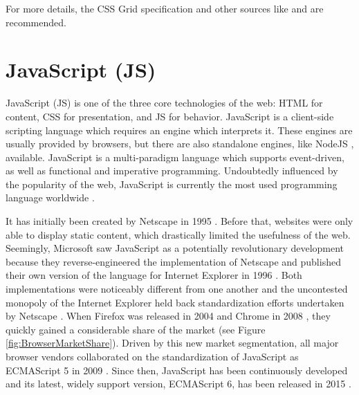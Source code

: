 For more details, the CSS Grid specification \parencite{CSSGrid} and
other sources like \textcite{GridLayoutInCSS} and
\textcite{House-GridGuide} are recommended.




\section{JavaScript (JS)}
\label{sec:JS}

JavaScript (JS) is one of the three core technologies of the web: HTML
for content, CSS for presentation, and JS for behavior. JavaScript is
a client-side scripting language which requires an engine which
interprets it. These engines are usually provided by browsers, but
there are also standalone engines, like NodeJS \parencite{NodeJS},
available.  JavaScript is a multi-paradigm language which supports
event-driven, as well as functional and imperative programming.
Undoubtedly influenced by the popularity of the web, JavaScript is
currently the most used programming language worldwide
\parencite{StatisticProgrammingLanguageUsage}.

It has initially been created by Netscape in 1995
\parencite{JSFirstRelease}.  Before that, websites were only able to
display static content, which drastically limited the usefulness of
the web.  Seemingly, Microsoft saw JavaScript as a potentially
revolutionary development because they reverse-engineered the
implementation of Netscape and published their own version of the
language for Internet Explorer in 1996 \parencite{JSIERelease}.  Both
implementations were noticeably different from one another and the
uncontested monopoly of the Internet Explorer
\parencite{BrowserMarketShareEarly} held back standardization efforts
undertaken by Netscape \parencite{ECMAScript1}.  When Firefox was
released in 2004 \parencite{FirefoxFirstRelease} and Chrome in 2008
\parencite{ChromeFirstRelease}, they quickly gained a considerable
share of the market \parencite{BrowserMarketShare} (see Figure
\ref{fig:BrowserMarketShare}).  Driven by this new market
segmentation, all major browser vendors collaborated on the
standardization of JavaScript as ECMAScript 5 in 2009
\parencite{ECMAScript5}.  Since then, JavaScript has been continuously
developed and its latest, widely support version, ECMAScript 6, has
been released in 2015 \parencite{ECMAScript6}.

